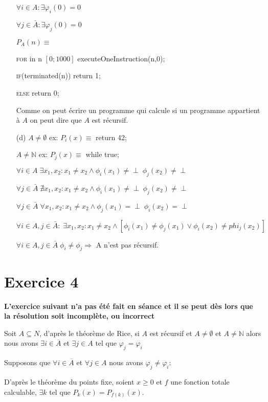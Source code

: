 \documentclass[a4paper,onecolumn,11pt]{article}
\begin{document}
\begin{itemize}
	$\forall i \in A : \exists \varphi_i(0) = 0$
	
	$\forall j \in \bar{A} : \exists \varphi_j(0) = 0$
	
	$P_A(n) \equiv$
	
	\textsc{for} in n $[0;1000]$ executeOneInstruction(n,0);
	 
	\textsc{if}(terminated(n)) return 1;
	 
	\textsc{else} return 0;
	
	Comme on peut écrire un programme qui calcule si un programme appartient à $A$ on peut dire que $A$ est récursif.
	
	\item[(d)] $A \neq \emptyset$ ex: $P_i(x) \equiv$ return 42;
	
	$A \neq \mathbb{N}$ ex: $P_j(x) \equiv$ while true;
	
	$\forall i \in A \; \exists x_1, x_2 : x_1 \neq x_2 \land \phi_i(x_1) \neq \perp \; \phi_j(x_2) \neq \perp$
	
	$\forall j \in \bar{A} \; \nexists x_1, x_2 : x_1 \neq x_2 \land \phi_i(x_1) \neq \perp \; \phi_j(x_2) \neq \perp$
	
	$\forall j \in \bar{A} \; \forall x_1, x_2 : x_1 \neq x_2 \land \phi_j(x_1) = \perp \; \phi_i(x_2) = \perp$
	
	$\forall i \in A, j \in \bar{A}: \; \exists x_1, x_2: x_1 \neq x_2 \land [\phi_i(x_1) \neq \phi_j(x_1) \lor \phi_i(x_2) \neq phi_j(x_2)]$
	
	$\forall i \in A, j \in \bar{A} \; \phi_i \neq \phi_j \Rightarrow$ A n'est pas récursif.
	
\end{itemize}

\section*{Exercice 4}

\textbf{L'exercice suivant n'a pas été fait en séance et il se peut dès lors que la résolution soit incomplète, ou incorrect}

Soit $A \subseteq N$, d'après le théorème de Rice, si $A$ est récursif et $A \neq \emptyset$ et $A\neq \mathbb{N}$ alors nous avons $\exists i \in \overline{A}$ et $\exists j \in A$ tel que $\varphi_j = \varphi_i$

Supposons que  $\forall i \in \overline{A}$ et $\forall j \in A$ nous avons $\varphi_j \neq \varphi_i$:

D'après le théorème du points fixe, soient $x \geq 0$ et $f$ une fonction totale calculable, $\exists k$ tel que $P_k(x) = P_{f(k)}(x)$.
\end{document}
